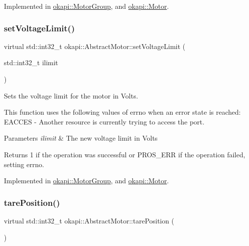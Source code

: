 Implemented in \mbox{\hyperlink{classokapi_1_1MotorGroup_aefc99f07b3b731ac2d24b3e380985ef4}{okapi\+::\+Motor\+Group}}, and \mbox{\hyperlink{classokapi_1_1Motor_af09e5a627843ec895b78077d8a5326a5}{okapi\+::\+Motor}}.

\mbox{\label{classokapi_1_1AbstractMotor_a2f33faf946b99cd34e9a591ccc33d644}} 
\subsubsection{\texorpdfstring{setVoltageLimit()}{setVoltageLimit()}}
{\footnotesize\ttfamily virtual std\+::int32\+\_\+t okapi\+::\+Abstract\+Motor\+::set\+Voltage\+Limit (\begin{DoxyParamCaption}\item[{std\+::int32\+\_\+t}]{ilimit }\end{DoxyParamCaption})\hspace{0.3cm}{\ttfamily [pure virtual]}}

Sets the voltage limit for the motor in Volts.

This function uses the following values of errno when an error state is reached\+: E\+A\+C\+C\+ES -\/ Another resource is currently trying to access the port.


\begin{DoxyParams}{Parameters}
{\em ilimit} & The new voltage limit in Volts \\
\hline
\end{DoxyParams}
\begin{DoxyReturn}{Returns}
1 if the operation was successful or P\+R\+O\+S\+\_\+\+E\+RR if the operation failed, setting errno. 
\end{DoxyReturn}


Implemented in \mbox{\hyperlink{classokapi_1_1MotorGroup_a1ccc0bc9af94c6bab28f2373a902b23a}{okapi\+::\+Motor\+Group}}, and \mbox{\hyperlink{classokapi_1_1Motor_a5aab4b416675b7f7ee324fff4d8cda30}{okapi\+::\+Motor}}.

\mbox{\label{classokapi_1_1AbstractMotor_ac36edbc92db85a11adcfee56275de15b}} 
\subsubsection{\texorpdfstring{tarePosition()}{tarePosition()}}
{\footnotesize\ttfamily virtual std\+::int32\+\_\+t okapi\+::\+Abstract\+Motor\+::tare\+Position (\begin{DoxyParamCaption}{ }\end{DoxyParamCaption})\hspace{0.3cm}{\ttfamily [pure virtual]}}

